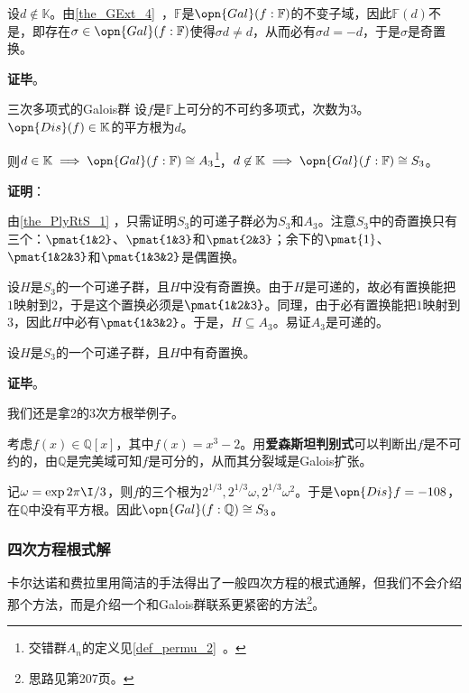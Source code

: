 设$d\not\in\mathbb{K}$。由\autoref{the_GExt_4}~，$\mathbb{F}$是$\opn{Gal}(f:\mathbb{F})$的不变子域，因此$\mathbb{F}(d)$不是，即存在$\sigma\in\opn{Gal}(f:\mathbb{F})$使得$\sigma d\neq d$，从而必有$\sigma d= -d$，于是$\sigma$是奇置换。

\textbf{证毕}。


\begin{corollary}{三次多项式的Galois群}\label{cor_PlyRtS_1}
设$f$是$\mathbb{F}$上可分的不可约多项式，次数为$3$。$\opn{Dis}(f)\in\mathbb{K}$的平方根为$d$。

则$d\in\mathbb{K}\implies\opn{Gal}(f:\mathbb{F})\cong A_3$\footnote{交错群$A_n$的定义见\autoref{def_permu_2}~。}，$d\not\in\mathbb{K}\implies\opn{Gal}(f:\mathbb{F})\cong S_3$。
\end{corollary}

\textbf{证明}：

由\autoref{the_PlyRtS_1} ，只需证明$S_3$的可递子群必为$S_3$和$A_3$。注意$S_3$中的奇置换只有三个：$\pmat{1&2}$、$\pmat{1&3}$和$\pmat{2&3}$；余下的$\pmat{1}$、$\pmat{1&2&3}$和$\pmat{1&3&2}$是偶置换。

设$H$是$S_3$的一个可递子群，且$H$中没有奇置换。由于$H$是可递的，故必有置换能把$1$映射到$2$，于是这个置换必须是$\pmat{1&2&3}$。同理，由于必有置换能把$1$映射到$3$，因此$H$中必有$\pmat{1&3&2}$。于是，$H\subseteq A_3$。易证$A_3$是可递的。

设$H$是$S_3$的一个可递子群，且$H$中有奇置换。

\textbf{证毕}。

\begin{example}{}
我们还是拿2的3次方根举例子。

考虑$f(x)\in\mathbb{Q}[x]$，其中$f(x)=x^3-2$。用\textbf{爱森斯坦判别式}可以判断出$f$是不可约的，由$\mathbb{Q}$是完美域可知$f$是可分的，从而其分裂域是Galois扩张。

记$\omega=\exp{2\pi\I/3}$，则$f$的三个根为$2^{1/3}, 2^{1/3}\omega, 2^{1/3}\omega^2$。于是$\opn{Dis}f=-108$，在$\mathbb{Q}$中没有平方根。因此$\opn{Gal}(f:\mathbb{Q})\cong S_3$。
\end{example}




\subsubsection{四次方程根式解}

卡尔达诺和费拉里用简洁的手法得出了一般四次方程的根式通解，但我们不会介绍那个方法，而是介绍一个和Galois群联系更紧密的方法\footnote{思路见\cite{GTM242}第207页。}。

